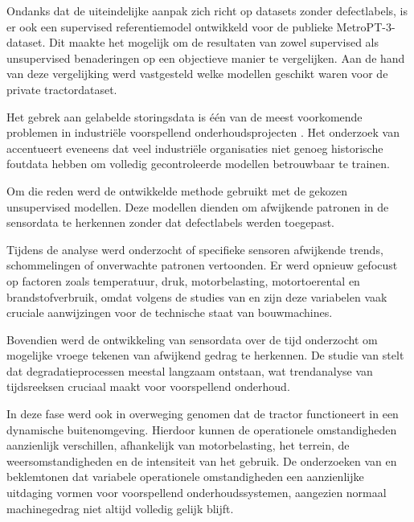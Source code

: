 Ondanks dat de uiteindelijke aanpak zich richt op datasets zonder defectlabels, is er ook een supervised referentiemodel ontwikkeld voor de publieke MetroPT-3-dataset. Dit maakte het mogelijk om de resultaten van zowel supervised als unsupervised benaderingen op een objectieve manier te vergelijken. Aan de hand van deze vergelijking werd vastgesteld welke modellen geschikt waren voor de private tractordataset.

Het gebrek aan gelabelde storingsdata  is één van de meest voorkomende problemen in industriële voorspellend onderhoudsprojecten \autocite{Giannoulidis2024}. Het onderzoek van \textcite{Carvalho2019} accentueert eveneens dat veel industriële organisaties niet genoeg historische foutdata hebben om volledig gecontroleerde modellen betrouwbaar te trainen.

Om die reden werd de ontwikkelde methode gebruikt met de gekozen unsupervised modellen. Deze modellen dienden om afwijkende patronen in de sensordata te herkennen zonder dat defectlabels werden toegepast.


Tijdens de analyse werd onderzocht of specifieke sensoren afwijkende trends, scho\-mmelingen of onverwachte patronen vertoonden. Er werd opnieuw gefocust op factoren zoals temperatuur, druk, motorbelasting, motortoerental en brandstofverbruik, omdat volgens de studies van \textcite{Mahale2025} en \textcite{Touil2025}zijn deze variabelen vaak cruciale aanwijzingen voor de technische staat van bouwmachines.

Bovendien werd de ontwikkeling van sensordata over de tijd onderzocht om mogelijke vroege tekenen van afwijkend gedrag te herkennen. De studie van \textcite{Xue2025} stelt dat degradatieprocessen meestal langzaam ontstaan, wat trendanalyse van tijdsreeksen cruciaal maakt voor voorspellend onderhoud.

In deze fase werd ook in overweging genomen dat de tractor functioneert in een dynamische buitenomgeving. Hierdoor kunnen de operationele omstandigheden aanzienlijk verschillen, afhankelijk van motorbelasting, het terrein, de weersomstandigheden en de intensiteit van het gebruik. De onderzoeken van \textcite{Mahfoud2025} en \textcite{Hu2024} beklemtonen dat variabele operationele omstandigheden een aanzienlijke uitdaging vormen voor voorspellend onderhoudssystemen, aangezien normaal machinegedrag niet altijd volledig gelijk blijft.

